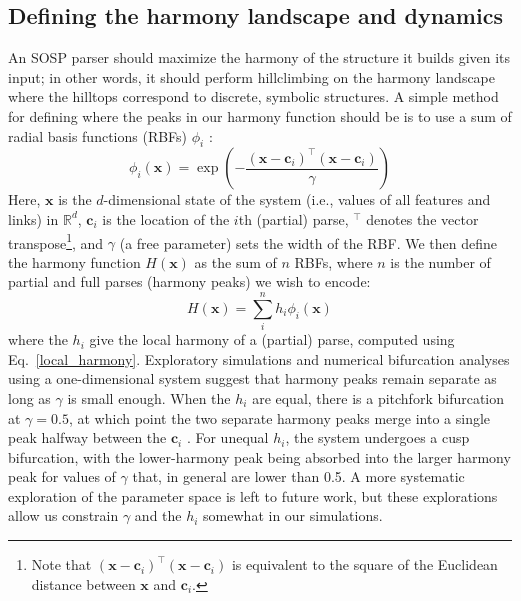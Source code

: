 \documentclass[10pt,letterpaper]{article}
\begin{document}
\subsection{Defining the harmony landscape and dynamics}
An SOSP parser should maximize the harmony of the structure it builds given its input; in other words, it should perform hillclimbing on the harmony landscape where the hilltops correspond to discrete, symbolic structures. A simple method for defining where the peaks in our harmony function should be is to use a sum of radial basis functions (RBFs) $\phi_i$ \cite{han1989convergence, ciocoiu1996analog, ciocoiu2009invariant, muezzinoglu2006rbf}:
$$
\phi_i(\mathbf{x}) = \exp\left(-\frac{(\mathbf{x} - \mathbf{c}_i)^\intercal(\mathbf{x} - \mathbf{c}_i)}{\gamma}\right)
$$
Here, $\mathbf{x}$ is the $d$-dimensional state of the system (i.e., values of all features and links) in $\mathbb{R}^d$, $\mathbf{c}_i$ is the location of the $i$th (partial) parse, $^\intercal$ denotes the vector transpose\footnote{Note that $(\mathbf{x} - \mathbf{c}_i)^\intercal(\mathbf{x} - \mathbf{c}_i)$ is equivalent to the square of the Euclidean distance between $\mathbf{x}$ and $\mathbf{c}_i$.}, and $\gamma$ (a free parameter) sets the width of the RBF. We then define the harmony function $H(\mathbf{x})$ as the sum of $n$ RBFs, where $n$ is the number of partial and full parses (harmony peaks) we wish to encode:
\begin{equation}\label{harmony}
H(\mathbf{x}) = \sum_{i}^{n} h_i \phi_i(\mathbf{x})
\end{equation}
where the $h_i$ give the local harmony of a (partial) parse, computed using Eq.~\ref{local_harmony}. Exploratory simulations and numerical bifurcation analyses \cite{meijer2009numerical} using a one-dimensional system suggest that harmony peaks remain separate as long as $\gamma$ is small enough. When the $h_i$ are equal, there is a pitchfork bifurcation at $\gamma = 0.5$, at which point the two separate harmony peaks merge into a single peak halfway between the $\mathbf{c}_i$ \cite[report a similar finding]{muezzinoglu2006rbf}. For unequal $h_i$, the system undergoes a cusp bifurcation, with the lower-harmony peak being absorbed into the larger harmony peak for values of $\gamma$ that, in general are lower than 0.5. A more systematic exploration of the parameter space is left to future work, but these explorations allow us constrain $\gamma$ and the $h_i$ somewhat in our simulations.
\end{document}
